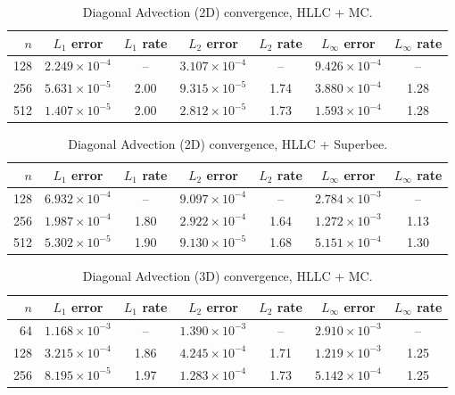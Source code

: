 \documentclass[11pt]{report}
\begin{document}
\begin{table}[htbp]
\centering
\caption{Diagonal Advection  (2D) convergence, HLLC + MC.}
\label{tab:diag-2D-MC}
\begin{tabular}{rcccccc}
\toprule
$n$ & $L_1$ error & $L_1$ rate & $L_2$ error & $L_2$ rate & $L_\infty$ error & $L_\infty$ rate \\
\midrule
128 & $2.249\times10^{-4}$ & --   & $3.107\times10^{-4}$ & --   & $9.426\times10^{-4}$ & --   \\
256 & $5.631\times10^{-5}$ & 2.00 & $9.315\times10^{-5}$ & 1.74 & $3.880\times10^{-4}$ & 1.28 \\
512 & $1.407\times10^{-5}$ & 2.00 & $2.812\times10^{-5}$ & 1.73 & $1.593\times10^{-4}$ & 1.28 \\
\bottomrule
\end{tabular}
\end{table}

\begin{table}[htbp]
\centering
\caption{Diagonal Advection  (2D) convergence,  HLLC + Superbee.}
\label{tab:diag-2D-superbee}
\begin{tabular}{rcccccc}
\toprule
$n$ & $L_1$ error & $L_1$ rate & $L_2$ error & $L_2$ rate & $L_\infty$ error & $L_\infty$ rate \\
\midrule
128 & $6.932\times10^{-4}$ & --   & $9.097\times10^{-4}$ & --   & $2.784\times10^{-3}$ & --   \\
256 & $1.987\times10^{-4}$ & 1.80 & $2.922\times10^{-4}$ & 1.64 & $1.272\times10^{-3}$ & 1.13 \\
512 & $5.302\times10^{-5}$ & 1.90 & $9.130\times10^{-5}$ & 1.68 & $5.151\times10^{-4}$ & 1.30 \\
\bottomrule
\end{tabular}
\end{table}

\begin{table}[htbp]
\centering
\caption{Diagonal Advection  (3D) convergence,  HLLC + MC.}
\label{tab:diag-3D-MC}
\begin{tabular}{rcccccc}
\toprule
$n$ & $L_1$ error & $L_1$ rate & $L_2$ error & $L_2$ rate & $L_\infty$ error & $L_\infty$ rate \\
\midrule
64  & $1.168\times10^{-3}$ & --   & $1.390\times10^{-3}$ & --   & $2.910\times10^{-3}$ & --   \\
128 & $3.215\times10^{-4}$ & 1.86 & $4.245\times10^{-4}$ & 1.71 & $1.219\times10^{-3}$ & 1.25 \\
256 & $8.195\times10^{-5}$ & 1.97 & $1.283\times10^{-4}$ & 1.73 & $5.142\times10^{-4}$ & 1.25 \\
\bottomrule
\end{tabular}
\end{table}
\end{document}
